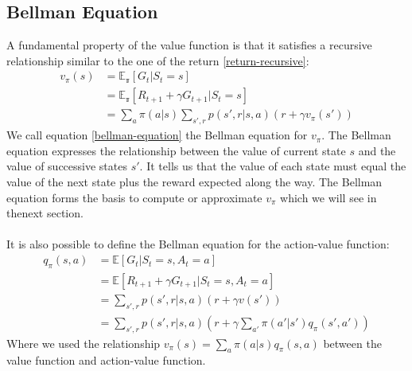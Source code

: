 \subsection{Bellman Equation}
A fundamental property of the value function is that it satisfies a recursive relationship similar to the one of the return \ref{return-recursive}:
\begin{equation}
    \begin{split}
        v_{\pi}(s) & = \mathds{E_{\pi}}[G_t | S_t = s] \\
        & = \mathds{E_{\pi}}[R_{t+1} + \gamma G_{t+1} | S_t = s] \\
        & = \sum_a \pi(a | s) \sum_{s', r} p(s', r | s, a) (r + \gamma v_{\pi}(s'))
    \end{split}
    \label{bellman-equation}
\end{equation}
We call equation \ref{bellman-equation} the Bellman equation for $v_{\pi}$. The Bellman equation expresses the relationship between the value of current state $s$ and the value of successive states $s'$. It tells us that the value of each state must equal the value of the next state plus the reward expected along the way. The Bellman equation forms the basis to compute or approximate $v_{\pi}$ which we will see in thenext  section.\\\\
It is also possible to define the Bellman equation for the action-value function:
\begin{equation}
    \begin{split}
        q_{\pi}(s, a) & = \mathds{E}[G_t | S_t = s, A_t = a] \\
        & = \mathds{E}[R_{t+1} + \gamma G_{t+1} | S_t = s, A_t = a] \\
        & = \sum_{s', r} p(s', r | s, a) (r + \gamma v(s')) \\
        & = \sum_{s', r} p(s', r | s, a) (r + \gamma \sum_{a'} \pi(a' | s') q_{\pi}(s', a'))
    \end{split}
    \label{bellman-equation-action-value}
\end{equation}
Where we used the relationship $v_{\pi}(s) = \sum_a \pi(a | s) q_{\pi}(s, a)$ between the value function and action-value function.\\\\

